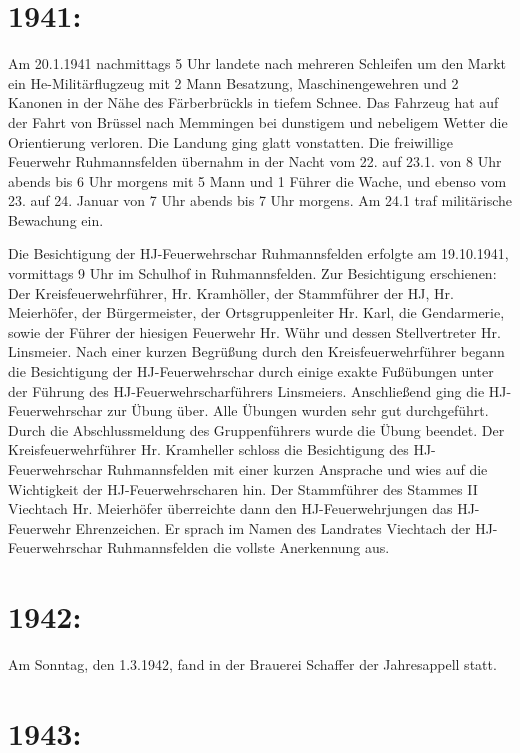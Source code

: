 \documentclass[12pt,a4paper]{book}
\begin{document}
\section{1941:}

Am 20.1.1941 nachmittags 5 Uhr landete nach mehreren Schleifen um den Markt ein
He-Militärflugzeug mit 2 Mann Besatzung, Maschinengewehren und 2 Kanonen in der
Nähe des Färberbrückls in tiefem Schnee. Das Fahrzeug hat auf der Fahrt von
Brüssel nach Memmingen bei dunstigem und nebeligem Wetter die Orientierung
verloren. Die Landung ging glatt vonstatten. Die freiwillige Feuerwehr
Ruhmannsfelden übernahm in der Nacht vom 22. auf 23.1. von 8 Uhr abends bis 6
Uhr morgens mit 5 Mann und 1 Führer die Wache, und ebenso vom 23. auf 24. Januar
von 7 Uhr abends bis 7 Uhr morgens. Am 24.1 traf militärische Bewachung ein.

Die Besichtigung der HJ-Feuerwehrschar Ruhmannsfelden erfolgte am 19.10.1941,
vormittags 9 Uhr im Schulhof in Ruhmannsfelden. Zur Besichtigung erschienen: Der
Kreisfeuerwehrführer, Hr. Kramhöller, der Stammführer der HJ, Hr. Meierhöfer,
der Bürgermeister, der Ortsgruppenleiter Hr. Karl, die Gendarmerie, sowie der
Führer der hiesigen Feuerwehr Hr. Wühr und dessen Stellvertreter Hr. Linsmeier.
Nach einer kurzen Begrüßung durch den Kreisfeuerwehrführer begann die
Besichtigung der HJ-Feuerwehrschar durch einige exakte Fußübungen unter der
Führung des HJ-Feuerwehrscharführers Linsmeiers. Anschließend ging die
HJ-Feuerwehrschar zur Übung über. Alle Übungen wurden sehr gut durchgeführt.
Durch die Abschlussmeldung des Gruppenführers wurde die Übung beendet. Der
Kreisfeuerwehrführer Hr. Kramheller schloss die Besichtigung des
HJ-Feuerwehrschar Ruhmannsfelden mit einer kurzen Ansprache und wies auf die
Wichtigkeit der HJ-Feuerwehrscharen hin. Der Stammführer des Stammes II
Viechtach Hr. Meierhöfer überreichte dann den HJ-Feuerwehrjungen das
HJ-Feuerwehr Ehrenzeichen. Er sprach im Namen des Landrates Viechtach der
HJ-Feuerwehrschar Ruhmannsfelden die vollste Anerkennung aus.

\section{1942:}

Am Sonntag, den 1.3.1942, fand in der Brauerei Schaffer der Jahresappell statt.

\section{1943:}
\end{document}
